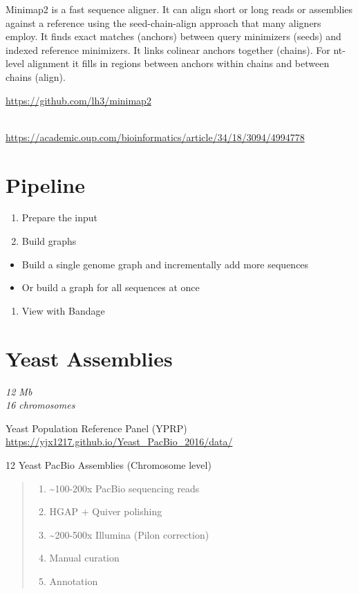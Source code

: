 \documentclass[
]{book}
\providecommand{\tightlist}{%
  \setlength{\itemsep}{0pt}\setlength{\parskip}{0pt}}
\begin{document}
Minimap2 is a fast sequence aligner.
It can align short or long reads or assemblies against a reference using the seed-chain-align approach that many aligners employ. It finds exact matches (anchors) between query minimizers (seeds) and indexed reference minimizers. It links colinear anchors together (chains). For nt-level alignment it fills in regions between anchors within chains and between chains (align).

\url{https://github.com/lh3/minimap2}\strut \\
\url{https://academic.oup.com/bioinformatics/article/34/18/3094/4994778}

\hypertarget{pipeline}{%
\section{Pipeline}\label{pipeline}}

\begin{enumerate}
\def\labelenumi{\arabic{enumi}.}
\tightlist
\item
  Prepare the input
\item
  Build graphs
\end{enumerate}

\begin{itemize}
\tightlist
\item
  Build a single genome graph and incrementally add more sequences
\item
  Or build a graph for all sequences at once
\end{itemize}

\begin{enumerate}
\def\labelenumi{\arabic{enumi}.}
\setcounter{enumi}{2}
\tightlist
\item
  View with Bandage
\end{enumerate}

\hypertarget{yeast-assemblies}{%
\section{Yeast Assemblies}\label{yeast-assemblies}}

\emph{12 Mb}\\
\emph{16 chromosomes}

Yeast Population Reference Panel (YPRP) \url{https://yjx1217.github.io/Yeast_PacBio_2016/data/}

12 Yeast PacBio Assemblies (Chromosome level)

\begin{quote}
\begin{enumerate}
\def\labelenumi{\arabic{enumi}.}
\tightlist
\item
  \textasciitilde100-200x PacBio sequencing reads
\item
  HGAP + Quiver polishing\\
\item
  \textasciitilde200-500x Illumina (Pilon correction)\\
\item
  Manual curation\\
\item
  Annotation
\end{enumerate}
\end{quote}
\end{document}
